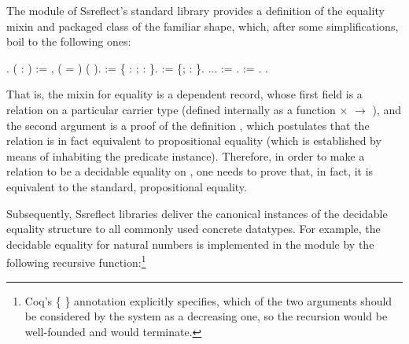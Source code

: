 The module  of Ssreflect's standard library
provides a definition of the equality mixin and packaged class of the
familiar shape, which, after some simplifications, boil to the
following ones:


\coqdoceol
\coqdocemptyline
\coqdocnoindent
{} .\coqdoceol
\coqdocnoindent
\coqdoceol
\coqdocnoindent
{}   ( :  ) := \coqdockw{\ensuremath{\forall}}  ,  ( = ) (  ).\coqdoceol
\coqdocnoindent
\coqdoceol
\coqdocnoindent
{}   :=  \{ :  ; \coqdocvar{\_} :  \}.\coqdoceol
\coqdocnoindent
{}  :=  \{; \coqdocvar{\_} :  \}.\coqdoceol
\coqdocnoindent
\coqdoceol
\coqdocnoindent
...\coqdoceol
\coqdocnoindent
\coqdoceol
\coqdocnoindent
{}  := .\coqdoceol
\coqdocnoindent
{}    :=   .\coqdoceol
\coqdocnoindent
\coqdoceol
\coqdocnoindent
{} .

\coqdocemptyline


That is, the mixin for equality is a dependent record, whose first
field is a relation  on a particular carrier type  (defined
internally as a function  \ensuremath{\times}  \ensuremath{\rightarrow} ), and the second argument is
a proof of the definition , which postulates that the relation
is in fact equivalent to propositional equality (which is
established by means of inhabiting the  predicate
instance). Therefore, in order to make a relation  to be a
decidable equality on , one needs to prove that, in fact, it is
equivalent to the standard, propositional equality.


Subsequently, Ssreflect libraries deliver the canonical instances of
the decidable equality structure to all commonly used concrete
datatypes. For example, the decidable equality for natural numbers is
implemented in the  module by the following
recursive function:\footnote{Coq's \{ \} annotation
explicitly specifies, which of the two arguments should be considered
by the system as a decreasing one, so the recursion would be
well-founded and  would terminate.}


